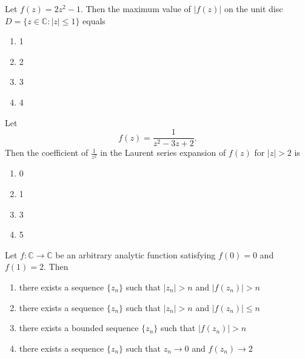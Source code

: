  \iffalse
    \title{Assignment}
    \author{EE24BTECH11035}
    \section{ma}
    \chapter{2007}
  \fi
\item Let $f(z) = 2z^2 - 1$. Then the maximum value of $|f(z)|$ on the unit disc $D = \{z \in \mathbb{C}: |z| \leq 1\}$ equals  
\begin{enumerate} 
    \item 1  
    \item 2  
    \item 3  
    \item 4  
\end{enumerate}

\item Let  
\begin{equation*}
f(z) = \frac{1}{z^2 - 3z + 2}.
\end{equation*}  
Then the coefficient of $\frac{1}{z^2}$ in the Laurent series expansion of $f(z)$ for $|z| > 2$ is
\begin{enumerate}
    \item 0
    \item 1
    \item 3
    \item 5
\end{enumerate}

\item  Let $f: \mathbb{C} \to \mathbb{C}$ be an arbitrary analytic function satisfying $f(0) = 0$ and $f(1) = 2$. Then
\begin{enumerate}
    \item there exists a sequence $\{z_n\}$ such that $|z_n| > n$ and $|f(z_n)| > n$
    \item there exists a sequence $\{z_n\}$ such that $|z_n| > n$ and $|f(z_n)| \leq n$
    \item there exists a bounded sequence $\{z_n\}$ such that $|f(z_n)| > n$
    \item there exists a sequence $\{z_n\}$ such that $z_n \to 0$ and $f(z_n) \to 2$
\end{enumerate}

